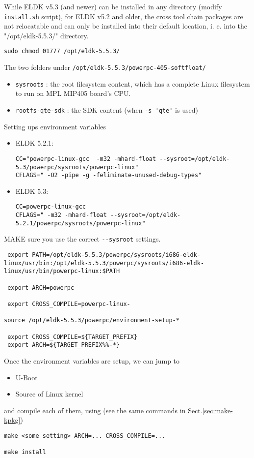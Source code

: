 While ELDK v5.3 (and newer) can be installed in any directory
(modify \verb!install.sh! script), for ELDK v5.2 and
older, the cross tool chain packages are not relocatable and can only be
installed into their default location, i. e. into the "/opt/eldk-5.5.3/"
directory.
\begin{verbatim}
sudo chmod 01777 /opt/eldk-5.5.3/
\end{verbatim}

The two folders under \verb!/opt/eldk-5.5.3/powerpc-405-softfloat/!
\begin{itemize}
  \item \verb!sysroots! : the root filesystem content,
  which has a complete Linux filesystem to run on MPL MIP405 board's CPU.
  
    \item \verb!rootfs-qte-sdk! : the SDK content (when \verb!-s 'qte'! is used)
\end{itemize}

Setting ups environment variables
\begin{itemize}
  \item ELDK 5.2.1:
\begin{verbatim}
CC="powerpc-linux-gcc  -m32 -mhard-float --sysroot=/opt/eldk-5.3/powerpc/sysroots/powerpc-linux"
CFLAGS=" -O2 -pipe -g -feliminate-unused-debug-types"
\end{verbatim}  

  \item ELDK 5.3:
\begin{verbatim}
CC=powerpc-linux-gcc
CFLAGS=" -m32 -mhard-float --sysroot=/opt/eldk-5.2.1/powerpc/sysroots/powerpc-linux"
\end{verbatim}
\end{itemize}
MAKE sure you use the correct \verb!--sysroot! settings.


\begin{verbatim}
 export PATH=/opt/eldk-5.5.3/powerpc/sysroots/i686-eldk-linux/usr/bin:/opt/eldk-5.5.3/powerpc/sysroots/i686-eldk-linux/usr/bin/powerpc-linux:$PATH
 
 export ARCH=powerpc
 
 export CROSS_COMPILE=powerpc-linux-
 
source /opt/eldk-5.5.3/powerpc/environment-setup-*

 export CROSS_COMPILE=${TARGET_PREFIX}
 export ARCH=${TARGET_PREFIX%%-*}
\end{verbatim}


Once the environment variables are setup, we can jump to 
\begin{itemize}
  \item U-Boot
  \item Source of Linux kernel
\end{itemize}
and compile each of them, using (see the same commands in Sect.\ref{sec:make-kpkg})
\begin{verbatim}
make <some setting> ARCH=... CROSS_COMPILE=...

make install 
\end{verbatim}

